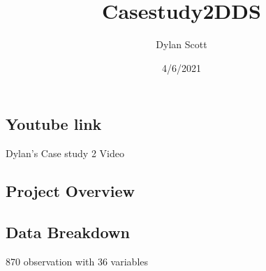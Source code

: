 \documentclass[
]{article}
\title{Casestudy2DDS}
\author{Dylan Scott}
\date{4/6/2021}
\begin{document}
\maketitle

\hypertarget{youtube-link}{%
\subsection{Youtube link}\label{youtube-link}}

Dylan's Case study 2 Video

\hypertarget{project-overview}{%
\subsection{Project Overview}\label{project-overview}}

\hypertarget{data-breakdown}{%
\subsection{Data Breakdown}\label{data-breakdown}}

870 observation with 36 variables
\end{document}
